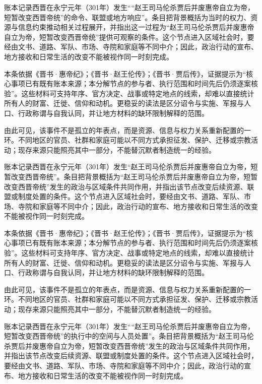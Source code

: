 账本记录西晋在永宁元年（301年）发生““赵王司马伦杀贾后并废惠帝自立为帝，短暂改变西晋帝统”的命令、联盟或地方响应”。条目把背景概括为当时的权力、资源与信息约束推动相关过程展开，并指出这一过程为“赵王司马伦杀贾后并废惠帝自立为帝，短暂改变西晋帝统”提供可观察的条件。这个节点进入区域社会时，要经由文书、道路、军队、市场、寺院和家庭等不同中介；因此，政治行动的宣布、地方接收和日常生活的改变不能被视作同一时刻完成。

本条依据《晋书·惠帝纪》；《晋书·赵王伦传》；《晋书·贾后传》，证据提示为“核心事项已有既有账本来源；本分解节点的参与者、执行范围和时间先后仍须逐案核验”。这些材料可支持年序、官方决定、战事或特定地点的线索，却难以直接统计所有人的财富、迁徙、信仰和动机。更稳妥的读法是区分诏令与实施、军报与人口、行政称谓与自我认同，并让地方材料的缺环限制解释的范围。

由此可见，该事件不是孤立的年表点，而是资源、信息与权力关系重新配置的一环。不同地区的官员、社群和家庭可能以不同方式承担征发、保护、迁移或宗教活动；现存来源只能照亮其中一部分，不能替沉默者制造统一的经验。

账本记录西晋在永宁元年（301年）发生“赵王司马伦杀贾后并废惠帝自立为帝，短暂改变西晋帝统”。条目把背景概括为“赵王司马伦杀贾后并废惠帝自立为帝，短暂改变西晋帝统”发生的政治与区域条件共同作用，并指出该节点改变后续资源、联盟或制度处置的条件。这个节点进入区域社会时，要经由文书、道路、军队、市场、寺院和家庭等不同中介；因此，政治行动的宣布、地方接收和日常生活的改变不能被视作同一时刻完成。

本条依据《晋书·惠帝纪》；《晋书·赵王伦传》；《晋书·贾后传》，证据提示为“核心事项已有既有账本来源；本分解节点的参与者、执行范围和时间先后仍须逐案核验”。这些材料可支持年序、官方决定、战事或特定地点的线索，却难以直接统计所有人的财富、迁徙、信仰和动机。更稳妥的读法是区分诏令与实施、军报与人口、行政称谓与自我认同，并让地方材料的缺环限制解释的范围。

由此可见，该事件不是孤立的年表点，而是资源、信息与权力关系重新配置的一环。不同地区的官员、社群和家庭可能以不同方式承担征发、保护、迁移或宗教活动；现存来源只能照亮其中一部分，不能替沉默者制造统一的经验。

账本记录西晋在永宁元年（301年）发生““赵王司马伦杀贾后并废惠帝自立为帝，短暂改变西晋帝统”的执行中的空间与人员处置”。条目把背景概括为“赵王司马伦杀贾后并废惠帝自立为帝，短暂改变西晋帝统”发生的政治与区域条件共同作用，并指出该节点改变后续资源、联盟或制度处置的条件。这个节点进入区域社会时，要经由文书、道路、军队、市场、寺院和家庭等不同中介；因此，政治行动的宣布、地方接收和日常生活的改变不能被视作同一时刻完成。

